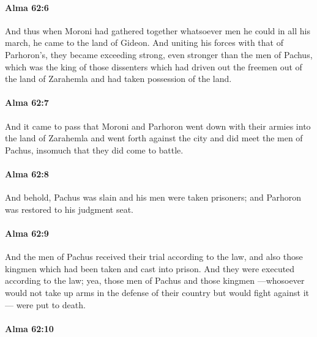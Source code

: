 		\paragraph{Alma 62:6} %
			\label{ALMA-62-6}

			And thus when Moroni had gathered together
			whatsoever men he could in all his march,
			he came to the land of Gideon.
			And uniting his forces with that of Parhoron's,
			they became exceeding strong,
			even stronger than the men of Pachus,
			which was the king of those dissenters
			which had driven out the freemen out of the land of Zarahemla
			and had taken possession of the land.

		\paragraph{Alma 62:7} %
			\label{ALMA-62-7}

			And it came to pass that Moroni and Parhoron went down
			with their armies into the land of Zarahemla
			and went forth against the city
			and did meet the men of Pachus,
			insomuch that they did come to battle.

		\paragraph{Alma 62:8} %
			\label{ALMA-62-8}

			And behold, Pachus was slain and his men were taken prisoners;
			and Parhoron was restored to his judgment seat.

		\paragraph{Alma 62:9} %
			\label{ALMA-62-9}

			And the men of Pachus received their trial according to the law,
			and also those kingmen which had been taken and cast into prison.
			And they were executed according to the law;
			yea, those men of Pachus and those kingmen
			---whosoever would not take up arms in the defense of their country
			but would fight against it---
			were put to death.

		\paragraph{Alma 62:10} %
			\label{ALMA-62-10}

